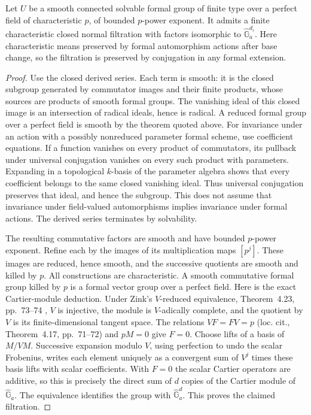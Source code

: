 \begin{lemma}
\label{C:formal-unipotent-filtration}
Let $U$ be a smooth connected solvable formal group of finite type over
a perfect field of characteristic $p$, of bounded $p$-power exponent.
It admits a finite characteristic closed normal filtration with factors
isomorphic to $\widehat{\mathbb G}_a^{d_i}$.  Here characteristic
means preserved by formal automorphism actions after base change, so
the filtration is preserved by conjugation in any formal extension.
\end{lemma}
\begin{proof}
Use the closed derived series.  Each term is smooth: it is the closed
subgroup generated by commutator images and their finite products,
whose sources are products of smooth formal groups.  The vanishing
ideal of this closed image is an intersection of radical ideals, hence
is radical.  A reduced formal group over a perfect field is smooth by
the theorem quoted above.  For invariance under an action with a
possibly nonreduced parameter formal scheme, use coefficient
equations.  If a function vanishes on every product of commutators,
its pullback under universal conjugation vanishes on every such
product with parameters.  Expanding in a topological $k$-basis of the
parameter algebra shows that every coefficient belongs to the same
closed vanishing ideal.  Thus universal conjugation preserves that
ideal, and hence the subgroup.  This does not assume that invariance
under field-valued automorphisms implies invariance under formal
actions.  The derived series terminates by solvability.

The resulting commutative factors are smooth and have bounded
$p$-power exponent.  Refine each by the images of its multiplication
maps $[p^j]$.  These images are reduced, hence smooth, and the
successive quotients are smooth and killed by $p$.  All constructions
are characteristic.  A smooth commutative formal group killed by $p$
is a formal vector group over a perfect field.  Here is the exact
Cartier-module deduction.  Under Zink's $V$-reduced equivalence,
Theorem~4.23, pp.~73--74 \cite{C4-Zink}, $V$ is injective, the module
is $V$-adically complete, and the quotient by $V$ is its finite-dimensional
tangent space.  The relations $VF=FV=p$ (loc. cit., Theorem~4.17,
pp.~71--72) and $pM=0$ give $F=0$.  Choose lifts of a basis of
$M/VM$.  Successive expansion modulo $V$, using perfection to undo
the scalar Frobenius, writes each element uniquely as a convergent
sum of $V^j$ times these basis lifts with scalar coefficients.
With $F=0$ the scalar Cartier operators are additive, so this is
precisely the direct sum of $d$ copies of the Cartier module of
$\widehat{\mathbb G}_a$.  The equivalence identifies the group
with $\widehat{\mathbb G}_a^d$.  This proves the claimed filtration.
\end{proof}

